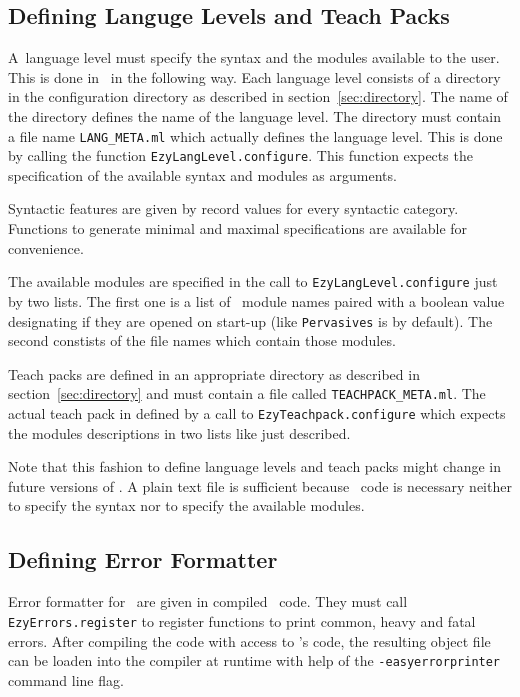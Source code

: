 \subsection{Defining Languge Levels and Teach Packs}

A\new\ language level must specify the syntax and the modules available to the user.
This is done in \easyocaml\ in the following way. Each language level consists
of a directory in the configuration directory as described in
section~\ref{sec:directory}. The name of the directory defines
the name of the language level. The directory must contain a file name
\texttt{LANG\_META.ml} which actually defines the language level. This is done
by calling the function \texttt{EzyLangLevel.configure}. This function expects
the specification of the available syntax and modules as arguments.

Syntactic features are given by record values for every syntactic category.
Functions to generate minimal and maximal specifications are available for
convenience.

The available modules are specified in the call to
\texttt{EzyLangLevel.configure} just by two lists. The first one is a list of
\ocaml\ module names paired with a boolean value designating if they are opened
on start-up (like \texttt{Pervasives} is by default). The second constists of
the file names which contain those modules.

Teach packs are defined in an appropriate directory as described in
section~\ref{sec:directory} and must contain a file called
\texttt{TEACHPACK\_META.ml}. The actual teach pack in defined by a call to
\texttt{EzyTeachpack.configure} which expects the modules descriptions in two
lists like just described.
 
Note that this fashion to define language levels and teach packs might change in
future versions of \easyocaml.  A plain text file is sufficient because \ocaml\
code is necessary neither to specify the syntax nor to specify the available
modules.

\subsection{Defining Error Formatter}
\label{sec:errorfmt}

Error formatter for \easyocaml\ are given in compiled \ocaml\ code. They must
call \texttt{EzyErrors.register} to register functions to print common, heavy
and fatal errors. After compiling the code with access to \easyocaml's code,
the resulting object file can be loaden into the compiler at runtime with help
of the \texttt{-easyerrorprinter} command line flag.

